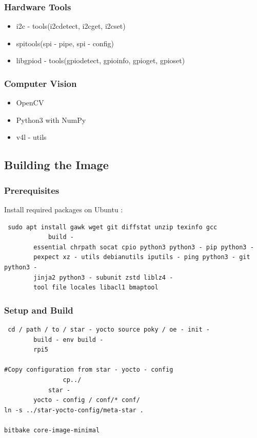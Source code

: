     \subsubsection{Hardware Tools}
    \begin{itemize}
    \item i2c - tools(i2cdetect, i2cget, i2cset)
    \item spitools(spi - pipe, spi - config)
    \item libgpiod - tools(gpiodetect, gpioinfo, gpioget, gpioset)
\end{itemize}

    \subsubsection{Computer Vision}
    \begin{itemize}
    \item OpenCV
    \item Python3 with NumPy
    \item v4l - utils
\end{itemize}

    \subsection{Building the Image}

    \subsubsection{Prerequisites}

        Install required packages on Ubuntu :
\begin{verbatim} sudo apt install gawk wget git diffstat unzip texinfo gcc
            build -
        essential chrpath socat cpio python3 python3 - pip python3 -
        pexpect xz - utils debianutils iputils - ping python3 - git python3 -
        jinja2 python3 - subunit zstd liblz4 -
        tool file locales libacl1 bmaptool
\end{verbatim}

    \subsubsection{Setup and Build}

    \begin{verbatim} cd / path / to / star - yocto source poky / oe - init -
        build - env build -
        rpi5

#Copy configuration from star - yocto - config
                cp../
            star -
        yocto - config / conf/* conf/
ln -s ../star-yocto-config/meta-star .

bitbake core-image-minimal
\end{verbatim}

